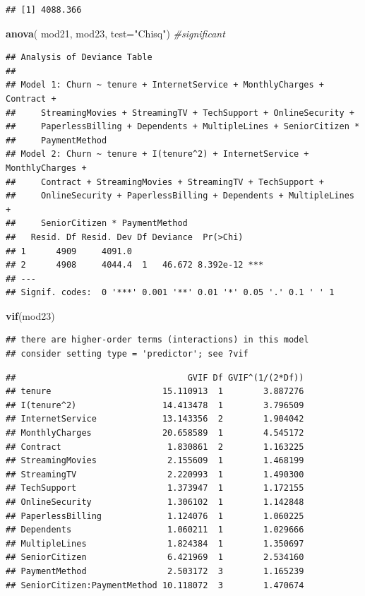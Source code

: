 \documentclass[
  twoside]{article}
\newenvironment{Shaded}{\begin{snugshade}}{\end{snugshade}}
\newcommand{\AttributeTok}[1]{\textcolor[rgb]{0.13,0.29,0.53}{#1}}
\newcommand{\CommentTok}[1]{\textcolor[rgb]{0.56,0.35,0.01}{\textit{#1}}}
\newcommand{\FunctionTok}[1]{\textcolor[rgb]{0.13,0.29,0.53}{\textbf{#1}}}
\newcommand{\NormalTok}[1]{#1}
\newcommand{\StringTok}[1]{\textcolor[rgb]{0.31,0.60,0.02}{#1}}
\begin{document}
\begin{verbatim}
## [1] 4088.366
\end{verbatim}

\begin{Shaded}
\begin{Highlighting}[]
\FunctionTok{anova}\NormalTok{( mod21, mod23,  }\AttributeTok{test=}\StringTok{"Chisq"}\NormalTok{) }\CommentTok{\#significant}
\end{Highlighting}
\end{Shaded}

\begin{verbatim}
## Analysis of Deviance Table
## 
## Model 1: Churn ~ tenure + InternetService + MonthlyCharges + Contract + 
##     StreamingMovies + StreamingTV + TechSupport + OnlineSecurity + 
##     PaperlessBilling + Dependents + MultipleLines + SeniorCitizen * 
##     PaymentMethod
## Model 2: Churn ~ tenure + I(tenure^2) + InternetService + MonthlyCharges + 
##     Contract + StreamingMovies + StreamingTV + TechSupport + 
##     OnlineSecurity + PaperlessBilling + Dependents + MultipleLines + 
##     SeniorCitizen * PaymentMethod
##   Resid. Df Resid. Dev Df Deviance  Pr(>Chi)    
## 1      4909     4091.0                          
## 2      4908     4044.4  1   46.672 8.392e-12 ***
## ---
## Signif. codes:  0 '***' 0.001 '**' 0.01 '*' 0.05 '.' 0.1 ' ' 1
\end{verbatim}

\begin{Shaded}
\begin{Highlighting}[]
\FunctionTok{vif}\NormalTok{(mod23)}
\end{Highlighting}
\end{Shaded}

\begin{verbatim}
## there are higher-order terms (interactions) in this model
## consider setting type = 'predictor'; see ?vif
\end{verbatim}

\begin{verbatim}
##                                  GVIF Df GVIF^(1/(2*Df))
## tenure                      15.110913  1        3.887276
## I(tenure^2)                 14.413478  1        3.796509
## InternetService             13.143356  2        1.904042
## MonthlyCharges              20.658589  1        4.545172
## Contract                     1.830861  2        1.163225
## StreamingMovies              2.155609  1        1.468199
## StreamingTV                  2.220993  1        1.490300
## TechSupport                  1.373947  1        1.172155
## OnlineSecurity               1.306102  1        1.142848
## PaperlessBilling             1.124076  1        1.060225
## Dependents                   1.060211  1        1.029666
## MultipleLines                1.824384  1        1.350697
## SeniorCitizen                6.421969  1        2.534160
## PaymentMethod                2.503172  3        1.165239
## SeniorCitizen:PaymentMethod 10.118072  3        1.470674
\end{verbatim}
\end{document}
